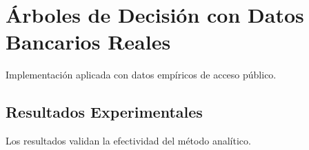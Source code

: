 \section{Árboles de Decisión con Datos Bancarios Reales}
Implementación aplicada con datos empíricos de acceso público.
\subsection{Resultados Experimentales}
Los resultados validan la efectividad del método analítico.
